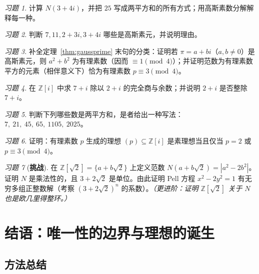 \documentclass[a4paper,11pt]{ctexart}
\numberwithin{equation}{section}
\theoremstyle{plain}
\theoremstyle{definition}
\theoremstyle{remark}
\newtheorem{exercise}{习题}[section]
\newcommand{\Z}{\mathbb{Z}}
\newcommand{\Ga}{\mathbb{Z}[i]}
\begin{document}
\begin{exercise}\label{ex:8-1}
计算 $N(3+4i)$，并把 $25$ 写成两平方和的所有方式；用高斯素数分解解释每一种。
\end{exercise}

\begin{exercise}\label{ex:8-2}
判断 $7,11,2+3i,3+4i$ 哪些是高斯素元，并说明理由。
\end{exercise}

\begin{exercise}\label{ex:8-3}
补全定理~\ref{thm:gaussprime} 末句的分类：证明若 $\pi=a+bi$（$a,b\neq0$）是高斯素元，则 $a^2+b^2$ 为有理素数（因而 $\equiv1\pmod4$）；并证明范数为有理素数平方的元素（相伴意义下）恰为有理素数 $p\equiv3\pmod4$。
\end{exercise}

\begin{exercise}\label{ex:8-4}
在 $\Ga$ 中求 $7+i$ 除以 $2+i$ 的完全商与余数；并说明 $2+i$ 是否整除 $7+i$。
\end{exercise}

\begin{exercise}\label{ex:8-5}
判断下列哪些数是两平方和，是者给出一种写法：$7,\ 21,\ 45,\ 65,\ 1105,\ 2025$。
\end{exercise}

\begin{exercise}\label{ex:8-6}
证明：有理素数 $p$ 生成的理想 $(p)\subseteq\Ga$ 是素理想当且仅当 $p=2$ 或 $p\equiv3\pmod4$。
\end{exercise}

\begin{exercise}[\textbf{挑战}]\label{ex:8-7}
在 $\Z[\sqrt2]=\{a+b\sqrt2\}$ 上定义范数 $N(a+b\sqrt2)=|a^2-2b^2|$。证明 $N$ 是乘法性的，且 $3+2\sqrt2$ 是单位。由此证明 Pell 方程 $x^2-2y^2=1$ 有无穷多组正整数解（考察 $(3+2\sqrt2)^n$ 的系数）。\emph{（更进阶：证明 $\Z[\sqrt2]$ 关于 $N$ 也是欧几里得整环。）}
\end{exercise}

\newpage

\section{结语：唯一性的边界与理想的诞生}\label{sec:conclusion}

\subsection{方法总结}
\end{document}
